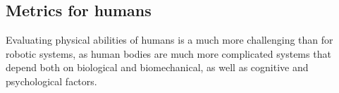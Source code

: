 
\subsection{Metrics for humans}

Evaluating physical abilities of humans is a much more challenging than for robotic systems, as human bodies are much more complicated systems that depend both on biological and biomechanical, as well as cognitive and psychological factors.

